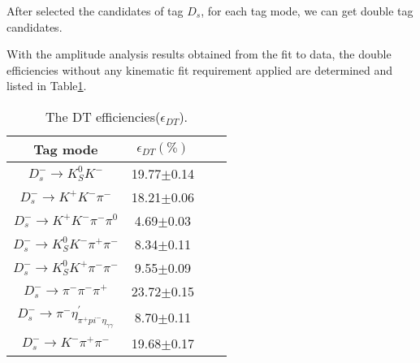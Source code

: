 After selected the candidates of tag $D_{s}$, for each tag mode, we can get double tag candidates. %


With the amplitude analysis results obtained from the fit to data, the double efficiencies without any kinematic fit requirement applied are determined and listed in Table\ref{DT-eff}.

    \begin{table}
        \caption{ The DT efficiencies($\epsilon_{DT}$).}
        \label{DT-eff}
        \begin{center}
            \begin{tabular}{cccc}
                \toprule\toprule
                Tag mode   & $\epsilon_{DT}(\%)$\\
                \hline
                $D_{s}^{-} \rightarrow K_{S}^{0}K^{-}$                                                   & 19.77$\pm$0.14\\
                $D_{s}^{-} \rightarrow K^{+}K^{-}\pi^{-}$                                                & 18.21$\pm$0.06\\
                $D_{s}^{-} \rightarrow K^{+}K^{-}\pi^{-}\pi^{0}$                                         &  4.69$\pm$0.03\\
                $D_{s}^{-} \rightarrow K_{S}^{0}K^{-}\pi^{+}\pi^{-}$                                     &  8.34$\pm$0.11\\
                $D_{s}^{-} \rightarrow K_{S}^{0}K^{+}\pi^{-}\pi^{-}$                                     &  9.55$\pm$0.09\\
                $D_{s}^{-} \rightarrow \pi^{-}\pi^{-}\pi^{+}$                                            & 23.72$\pm$0.15\\
                $D_{s}^{-} \rightarrow \pi^{-}\eta_{\pi^{+}pi^{-}\eta_{\gamma\gamma}}^{'}$               &  8.70$\pm$0.11\\
                $D_{s}^{-} \rightarrow K^{-}\pi^{+}\pi^{-}$                                              & 19.68$\pm$0.17\\
                \bottomrule\bottomrule
            \end{tabular}
        \end{center}
    \end{table}


